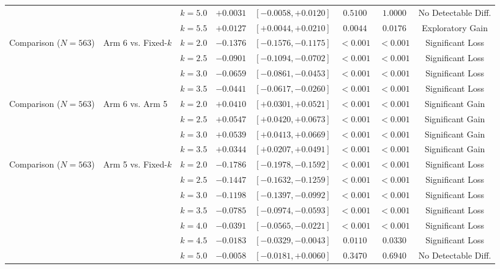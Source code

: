 \documentclass[conference]{IEEEtran}
\begin{document}
\begin{table}[t]
{\begin{tabular}{lllccccc}
 & & $k=5.0$ & $+0.0031$ & $[-0.0058, +0.0120]$ & $0.5100$ & $1.0000$ & No Detectable Diff. \\
 & & $k=5.5$ & $+0.0127$ & $[+0.0044, +0.0210]$ & $0.0044$ & $0.0176$ & Exploratory Gain \\
\midrule
Comparison ($N=563$) & Arm 6 vs. Fixed-$k$
   & $k=2.0$ & $-0.1376$ & $[-0.1576, -0.1175]$ & $<0.001$ & $<0.001$ & Significant Loss \\
 & & $k=2.5$ & $-0.0901$ & $[-0.1094, -0.0702]$ & $<0.001$ & $<0.001$ & Significant Loss \\
 & & $k=3.0$ & $-0.0659$ & $[-0.0861, -0.0453]$ & $<0.001$ & $<0.001$ & Significant Loss \\
 & & $k=3.5$ & $-0.0441$ & $[-0.0617, -0.0260]$ & $<0.001$ & $<0.001$ & Significant Loss \\
\midrule
Comparison ($N=563$) & Arm 6 vs. Arm 5
   & $k=2.0$ & $+0.0410$ & $[+0.0301, +0.0521]$ & $<0.001$ & $<0.001$ & Significant Gain \\
 & & $k=2.5$ & $+0.0547$ & $[+0.0420, +0.0673]$ & $<0.001$ & $<0.001$ & Significant Gain \\
 & & $k=3.0$ & $+0.0539$ & $[+0.0413, +0.0669]$ & $<0.001$ & $<0.001$ & Significant Gain \\
 & & $k=3.5$ & $+0.0344$ & $[+0.0207, +0.0491]$ & $<0.001$ & $<0.001$ & Significant Gain \\
\midrule
Comparison ($N=563$) & Arm 5 vs. Fixed-$k$
   & $k=2.0$ & $-0.1786$ & $[-0.1978, -0.1592]$ & $<0.001$ & $<0.001$ & Significant Loss \\
 & & $k=2.5$ & $-0.1447$ & $[-0.1632, -0.1259]$ & $<0.001$ & $<0.001$ & Significant Loss \\
 & & $k=3.0$ & $-0.1198$ & $[-0.1397, -0.0992]$ & $<0.001$ & $<0.001$ & Significant Loss \\
 & & $k=3.5$ & $-0.0785$ & $[-0.0974, -0.0593]$ & $<0.001$ & $<0.001$ & Significant Loss \\
 & & $k=4.0$ & $-0.0391$ & $[-0.0565, -0.0221]$ & $<0.001$ & $<0.001$ & Significant Loss \\
 & & $k=4.5$ & $-0.0183$ & $[-0.0329, -0.0043]$ & $0.0110$ & $0.0330$ & Significant Loss \\
 & & $k=5.0$ & $-0.0058$ & $[-0.0181, +0.0060]$ & $0.3470$ & $0.6940$ & No Detectable Diff. \\
\bottomrule
\end{tabular}%
}
\vspace{1ex}
\begin{flushleft}

\end{flushleft}
\end{table}
\end{document}
